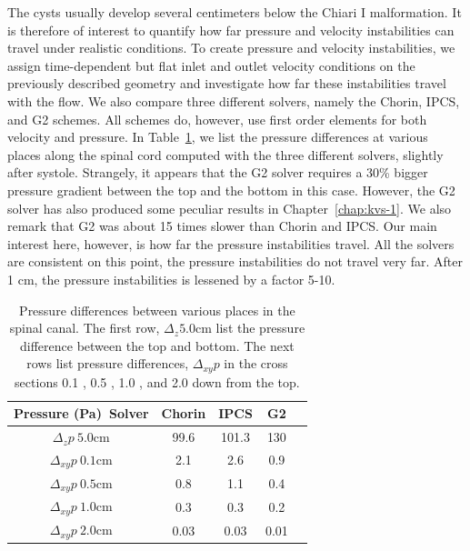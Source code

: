 The cysts usually develop several centimeters below the Chiari I
malformation. It is therefore of interest to quantify how far pressure
and velocity instabilities can travel under realistic conditions.  To
create pressure and velocity instabilities, we assign time-dependent
but flat inlet and outlet velocity conditions on the previously
described geometry and investigate how far these instabilities travel
with the flow. We also compare three different solvers, namely the
Chorin, IPCS, and G2 schemes.  All schemes do, however, use first
order elements for both velocity and pressure. In
Table~\ref{solvers:pressurediff}, we list the pressure differences at
various places along the spinal cord computed with the three different
solvers, slightly after systole. Strangely, it appears that the G2
solver requires a 30\% bigger pressure gradient between the top and
the bottom in this case. However, the G2 solver has also produced some
peculiar results in Chapter~\ref{chap:kvs-1}. We also remark that G2
was about 15 times slower than Chorin and IPCS. Our main interest
here, however, is how far the pressure instabilities travel. All the
solvers are consistent on this point, the pressure instabilities do
not travel very far. After 1 cm, the pressure instabilities is
lessened by a factor 5-10.

\begin{table}
  \centering
  \begin{tabular}{|c|c|c|c|c|} \hline
    Pressure (Pa)\ Solver & Chorin & IPCS & G2 \\ \hline
    $\Delta_z p \ 5.0 \mathrm{cm}$  & 99.6 & 101.3 & 130     \\ \hline
    $\Delta_{xy} p  \ 0.1 \mathrm{cm}$  &  2.1 & 2.6 & 0.9     \\ \hline
    $\Delta_{xy}  p  \ 0.5 \mathrm{cm}$  & 0.8 & 1.1 & 0.4     \\ \hline
    $\Delta_{xy}  p  \ 1.0 \mathrm{cm}$  & 0.3 & 0.3 & 0.2     \\ \hline
    $\Delta_{xy}  p  \ 2.0 \mathrm{cm}$  &  0.03 & 0.03 & 0.01     \\ \hline
  \end{tabular}
  \caption{Pressure differences between various places in the spinal canal.
    The first row, $\Delta_z 5.0 \mathrm{cm}$ list the pressure difference between the
    top and bottom. The next rows list pressure differences, $\Delta_{xy}
    p$ in the cross sections 0.1 , 0.5 , 1.0 , and 2.0  down from
    the top.}
  \label{solvers:pressurediff}
\end{table}

